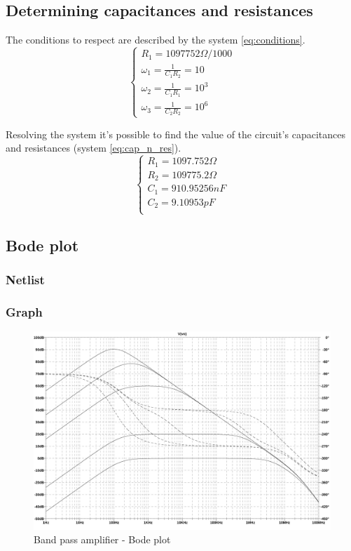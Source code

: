 \documentclass[10pt,a4paper]{article}
\begin{document}
\subsection{Determining capacitances and resistances}
The conditions to respect are described by the system \ref{eq:conditions}.
\begin{equation}
  \left\{
  \begin{array}{l}
    R_1 = 1097752\Omega/1000 \\
    \omega_1 = \frac{1}{C_1R_2} = 10 \\
    \omega_2 = \frac{1}{C_1R_1} = 10^3 \\
    \omega_3 = \frac{1}{C_2R_2} = 10^6
  \end{array}
  \right. \label{eq:conditions}
\end{equation}

Resolving the system it's possible to find the value of the circuit's capacitances and resistances (system \ref{eq:cap_n_res}).
\begin{equation}
  \left\{
  \begin{array}{l}
    R_1 = 1097.752\Omega\\
    R_2 = 109775.2\Omega\\
    C_1 = 910.95256nF\\
    C_2 = 9.10953pF\\
  \end{array}
  \right. \label{eq:cap_n_res}
\end{equation}

\subsection{Bode plot}
\subsubsection{Netlist}


\subsubsection{Graph}
\begin{figure}[H]
  \centering
  \includegraphics[width=14cm]{graph/2d3.jpg}
  \caption{Band pass amplifier - Bode plot}
  \label{2d3graph}
\end{figure}
\end{document}
